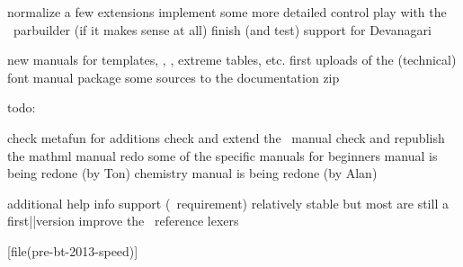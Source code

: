 \starttopic[title={Fonts\\next on the todo list}]

    \startitemize
        \startitem normalize a few extensions \FlushStep \stopitem
        \startitem implement some more detailed control \FlushStep \stopitem
        \startitem play with the \LUA\ parbuilder (if it makes sense at all) \FlushStep \stopitem
        \startitem finish (and test) support for Devanagari \FlushStep \stopitem
    \stopitemize

\stoptopic

\StopSteps

\StartSteps

\starttopic[title=Manuals]

    \startitemize
        \startitem new manuals for templates, \SQL, \SCITE, extreme tables, etc. \FlushStep \stopitem
        \startitem first uploads of the (technical) font manual \FlushStep \stopitem
        \startitem package some sources to the documentation zip \FlushStep \stopitem
    \stopitemize

    todo:

    \startitemize
        \startitem check metafun for additions \FlushStep \stopitem
        \startitem check and extend the \XML\ manual \FlushStep \stopitem
        \startitem check and republish the mathml manual \FlushStep \stopitem
        \startitem redo some of the specific manuals for \MKIV \FlushStep \stopitem
        \startitem beginners manual is being redone (by Ton) \FlushStep \stopitem
        \startitem chemistry manual is being redone (by Alan) \FlushStep \stopitem
    \stopitemize

\stoptopic

\StopSteps

\StartSteps

\starttopic[title=Scripts]

    \startitemize
        \startitem additional help info support (\TEXLIVE\ requirement) \FlushStep \stopitem
        \startitem relatively stable but most are still a first||version \FlushStep \stopitem
        \startitem improve the \SCITE\ reference lexers \FlushStep \stopitem
    \stopitemize

\stoptopic

\StopSteps

\starttopic[title=Speed]

[file(pre-bt-2013-speed)] \FlushStep

\stoptopic

\stopdocument
